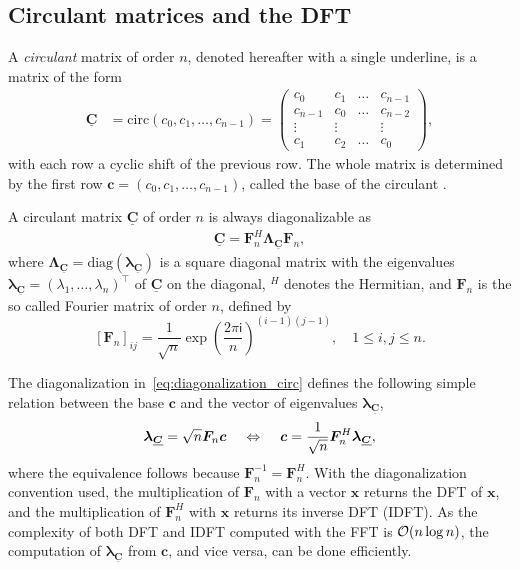 \documentclass[12pt]{article}
\newcommand{\mycirc}[1] {\underline{\bm{#1}}}
\begin{document}
\subsection{Circulant matrices and the DFT}
A \textit{circulant} matrix of order $n$, denoted hereafter with a single underline, is a matrix of the form 
\begin{equation}\label{circMatrix}
\begin{split}
\mycirc{C} &= \mbox{circ}(c_0, c_1, \dots, c_{n-1}) =\begin{pmatrix}
c_{0} & c_{1} & \dots & c_{n-1}\\ 
c_{n-1} & c_{0} & \dots & c_{n-2} \\ 
\vdots & \vdots &  & \vdots \\
c_{1} & c_{2} & \dots & c_{0}
\end{pmatrix},
\end{split}
\end{equation}
with each row a cyclic shift of the previous row. The whole matrix is determined by the first row $\bm{c} = (c_0, c_1, \dots, c_{n-1})$, called the base of the circulant \citep{Davis1979}. 

A circulant matrix $\mycirc{C}$ of order $n$ is always diagonalizable as
\begin{align} \label{eq:diagonalization_circ}
  \mycirc{C} = \bm{F}_n^H\bm{\Lambda}_{\mycirc{C}}\bm{F}_n,
\end{align}
where $\bm{\Lambda}_{\mycirc{C}}=\mbox{diag}(\bm{\lambda}_{\mycirc{C}})$ is a square diagonal matrix with the eigenvalues
$\bm{\lambda}_{\mycirc{C}}=(\lambda_1,\ldots,\lambda_n)^{\top}$ of $\mycirc{C}$ on the diagonal, $^H$ denotes the Hermitian, and $\bm{F}_n$ is the so called Fourier matrix of order $n$, defined by
\begin{equation} 
    \left [ \bm{F}_n \right ]_{ij} = \frac{1}{\sqrt{n}} \exp{ \left ( \frac{2\pi \mathsf{i}}{n} \right )}^{(i-1)(j-1)}, \quad 1 \le i, j \le n.
\end{equation}

The diagonalization in~\eqref{eq:diagonalization_circ} defines the following simple relation between the base $\bm{c}$ and the vector of eigenvalues $\bm{\lambda}_{\mycirc{C}}$,
\begin{align} \label{eq:eigenvalues_fft_matrix}
  \bm{\lambda}_{\mycirc{C}} = \sqrt{n}\bm{F}_n\bm{c} \hspace*{0.4cm}\Leftrightarrow\hspace*{0.4cm}
  \bm{c}=\frac{1}{\sqrt{n}}\bm{F}_n^H \bm{\lambda}_{\mycirc{C}},
\end{align}
where the equivalence follows because $\bm{F}_n^{-1}=\bm{F}_n^H$. 
With the diagonalization convention used, the multiplication of $\bm{F}_n$ with a vector $\bm{x}$ returns the DFT of $\bm{x}$, and the multiplication of $\bm{F}_n^H$  with $\bm{x}$ returns its inverse DFT (IDFT). As the complexity of both DFT and IDFT computed with the FFT is ${\cal O}(n\log n)$, the computation of $\bm{\lambda}_{\mycirc{C}}$ from $\bm{c}$, and vice versa, can be done efficiently.
\end{document}
